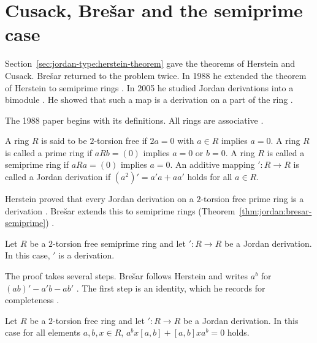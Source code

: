 \section{Cusack, Brešar and the semiprime case}\label{sec:jordan-type:semiprime}

Section~\ref{sec:jordan-type:herstein-theorem} gave the theorems of Herstein and Cusack.
Brešar returned to the problem twice. In 1988 he extended the theorem of Herstein to semiprime
rings \cite[p.~1003]{Bresar1988}. In 2005 he studied Jordan derivations into a bimodule \cite[p.~411]{Bresar2005}.
He showed that such a map is a derivation on a part of the ring \cite[p.~411]{Bresar2005}.


The 1988 paper begins with its definitions. All rings are associative \cite[p.~1003]{Bresar1988}.

\begin{definition}\label{def:jordan:bresar-1988}
A ring $R$ is said to be $2$-torsion free if $2a=0$ with $a\in R$ implies $a=0$. A ring $R$
is called a prime ring if $aRb=(0)$ implies $a=0$ or $b=0$. A ring $R$ is called a semiprime
ring if $aRa=(0)$ implies $a=0$. An additive mapping $'\colon R\to R$ is called a Jordan
derivation if $(a^{2})'=a'a+aa'$ holds for all $a\in R$.
\end{definition}

Herstein proved that every Jordan derivation on a $2$-torsion free prime ring
is a derivation \cite[p.~1003]{Bresar1988}. Brešar extends this to semiprime rings (Theorem~\ref{thm:jordan:bresar-semiprime}) \cite[p.~1003]{Bresar1988}.

\begin{theorem}\label{thm:jordan:bresar-semiprime}
Let $R$ be a $2$-torsion free semiprime ring and let $'\colon R\to R$ be a Jordan
derivation. In this case, $'$ is a derivation.
\end{theorem}

The proof takes several steps. Brešar follows Herstein and writes $a^{b}$ for
$(ab)'-a'b-ab'$ \cite[p.~1004]{Bresar1988}. The first step is an identity, which he records
for completeness \cite[p.~1004]{Bresar1988}.

\begin{theorem}\label{thm:jordan:bresar-identity}
Let $R$ be a $2$-torsion free ring and let $'\colon R\to R$ be a Jordan derivation.
In this case for all elements $a,b,x\in R$,
$a^{b}x[a,b]+[a,b]xa^{b}=0$ holds.
\end{theorem}

